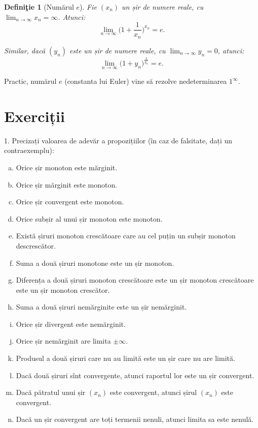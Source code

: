 \documentclass[11pt,a4paper]{article}
\newcommand\ds{\displaystyle}
\theoremstyle{dotless}
\theoremstyle{dotlessdr}
\newtheorem{definition}{Defini\c{t}ie}[section]
\begin{document}
\begin{definition}[Numărul $e$]\label{def:e}
  Fie $(x_n)$ un șir de numere reale, cu $\ds\lim_{n \to \infty} x_n = \infty$. Atunci:
  \[
    \lim_{n \to \infty} \Big( 1 + \frac{1}{x_n} \Big)^{x_n} = e.
  \]
  
  Similar, dacă $(y_n)$ este un șir de numere reale, cu $\ds\lim_{n \to \infty} y_n = 0$,
  atunci:
  \[
    \lim_{n \to \infty} \Big( 1 + y_n \Big)^{\frac{1}{y_n}} = e.
  \]
\end{definition}

Practic, numărul $e$ (constanta lui Euler) vine să rezolve nedeterminarea $1^\infty$.


\section{Exerciții}

1. Precizați valoarea de adevăr a propozițiilor (în caz de falsitate, dați un contraexemplu):
\begin{enumerate}[(a)]
  \item Orice șir monoton este mărginit.
  \item Orice șir mărginit este monoton.
  \item Orice șir convergent este monoton.
  \item Orice subșir al unui șir monoton este monoton.
  \item Există șiruri monoton crescătoare care au cel puțin un subșir monoton descrescător.
  \item Suma a două șiruri monotone este un șir monoton.
  \item Diferența a două șiruri monoton crescătoare este un șir monoton crescătoare este un șir
    monoton crescător.
  \item Suma a două șiruri nemărginite este un șir nemărginit.
  \item Orice șir divergent este nemărginit.
  \item Orice șir nemărginit are limita $\pm \infty$.
  \item Produsul a două șiruri care nu au limită este un șir care nu are limită.
  \item Dacă două șiruri sînt convergente, atunci raportul lor este un șir convergent.
  \item Dacă pătratul unui șir $(x_n)$ este convergent, atunci șirul $(x_n)$ este convergent.
  \item Dacă un șir convergent are toți termenii nenuli, atunci limita sa este nenulă.
\end{enumerate}
\end{document}
